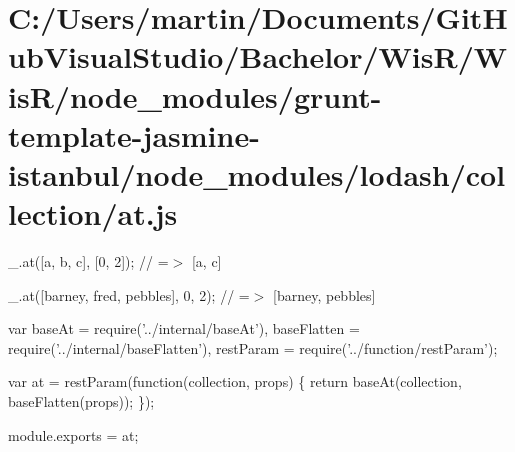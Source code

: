 \hypertarget{_c_1_2_users_2martin_2_documents_2_git_hub_visual_studio_2_bachelor_2_wis_r_2_wis_r_2node_module2597d2cf72857a9b6ac52864d31f4e2d}{}\section{C\+:/\+Users/martin/\+Documents/\+Git\+Hub\+Visual\+Studio/\+Bachelor/\+Wis\+R/\+Wis\+R/node\+\_\+modules/grunt-\/template-\/jasmine-\/istanbul/node\+\_\+modules/lodash/collection/at.\+js}
\+\_\+.\+at(\mbox{[}\textquotesingle{}a\textquotesingle{}, \textquotesingle{}b\textquotesingle{}, \textquotesingle{}c\textquotesingle{}\mbox{]}, \mbox{[}0, 2\mbox{]}); // =$>$ \mbox{[}\textquotesingle{}a\textquotesingle{}, \textquotesingle{}c\textquotesingle{}\mbox{]}

\+\_\+.\+at(\mbox{[}\textquotesingle{}barney\textquotesingle{}, \textquotesingle{}fred\textquotesingle{}, \textquotesingle{}pebbles\textquotesingle{}\mbox{]}, 0, 2); // =$>$ \mbox{[}\textquotesingle{}barney\textquotesingle{}, \textquotesingle{}pebbles\textquotesingle{}\mbox{]}


\begin{DoxyCodeInclude}
var baseAt = require(\textcolor{stringliteral}{'../internal/baseAt'}),
    baseFlatten = require(\textcolor{stringliteral}{'../internal/baseFlatten'}),
    restParam = require(\textcolor{stringliteral}{'../function/restParam'});

var at = restParam(\textcolor{keyword}{function}(collection, props) \{
  \textcolor{keywordflow}{return} baseAt(collection, baseFlatten(props));
\});

module.exports = at;
\end{DoxyCodeInclude}
 